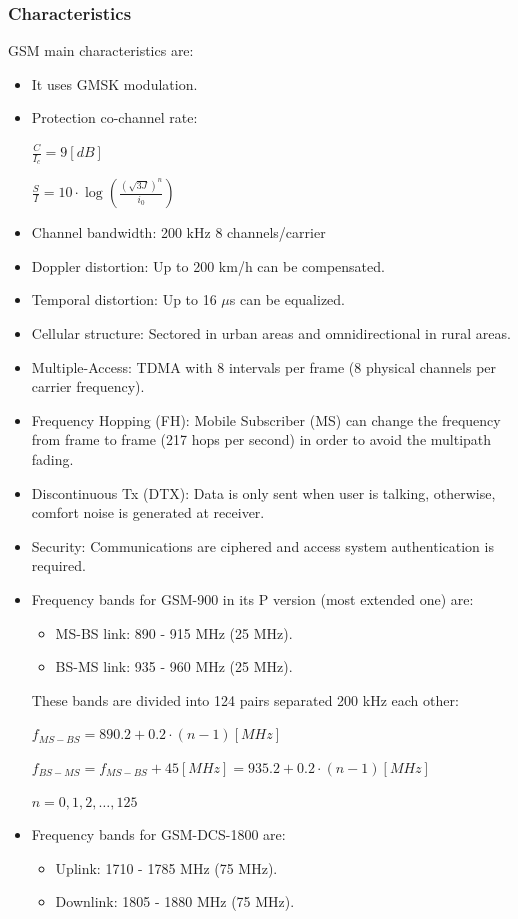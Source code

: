 \documentclass[
	12pt,
	twoside
]{book}
\begin{document}
\subsubsection{Characteristics}

GSM main characteristics are:

\begin{itemize}
	\item It uses GMSK modulation.
	\item {
		Protection co-channel rate:

		$\frac {C} {I_c} = 9 [dB]$

		$\frac {S} {I} = 10 \cdot \log \left( \frac {\left( \sqrt{3 J} \right)^n} {i_0} \right)$
	}
	\item Channel bandwidth: 200 kHz 8 channels/carrier
	\item Doppler distortion: Up to 200 km/h can be compensated.
	\item Temporal distortion: Up to 16 $\mu$s can be equalized.
	\item Cellular structure: Sectored in urban areas and omnidirectional in rural areas.
	\item Multiple-Access: TDMA with 8 intervals per frame (8 physical channels per carrier frequency).
	\item Frequency Hopping (FH): Mobile Subscriber (MS) can change the frequency from frame to frame (217 hops per second) in order to avoid the multipath fading.
	\item Discontinuous Tx (DTX): Data is only sent when user is talking, otherwise, comfort noise is generated at receiver.
	\item Security: Communications are ciphered and access system authentication is required.
	\item {
		Frequency bands for GSM-900 in its P version (most extended one) are:
		\begin{itemize}
			\item MS-BS link: 890 - 915 MHz (25 MHz).
			\item BS-MS link: 935 - 960 MHz (25 MHz).
		\end{itemize}
		These bands are divided into 124 pairs separated 200 kHz each other:

		$f_{MS-BS} = 890.2 + 0.2 \cdot (n - 1) [MHz]$

		$f_{BS-MS} = f_{MS-BS} + 45 [MHz] = 935.2 + 0.2 \cdot (n - 1) [MHz]$

		$n = 0, 1, 2, \ldots, 125$
	}
	\item {
		Frequency bands for GSM-DCS-1800 are:
		\begin{itemize}
			\item Uplink: 1710 - 1785 MHz (75 MHz).
			\item Downlink: 1805 - 1880 MHz (75 MHz).
		\end{itemize}
	}
\end{itemize}
\end{document}
